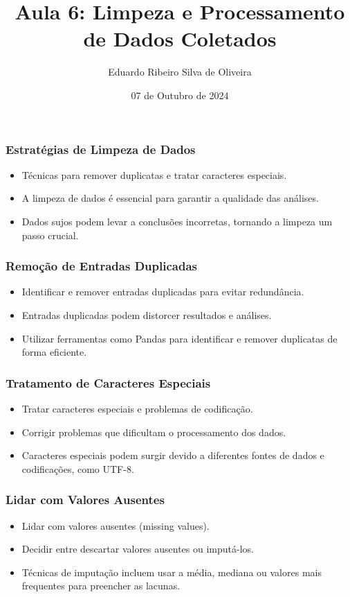\documentclass{beamer}
\title{Aula 6: Limpeza e Processamento de Dados Coletados}
\author{Eduardo Ribeiro Silva de Oliveira}
\date{07 de Outubro de 2024}
\begin{document}
\frame{\titlepage}

\begin{frame}
  \frametitle{Estratégias de Limpeza de Dados}
  \begin{itemize}
    \item Técnicas para remover duplicatas e tratar caracteres especiais.
    \item A limpeza de dados é essencial para garantir a qualidade das análises.
    \item Dados sujos podem levar a conclusões incorretas, tornando a limpeza um passo crucial.
  \end{itemize}
\end{frame}

\begin{frame}
  \frametitle{Remoção de Entradas Duplicadas}
  \begin{itemize}
    \item Identificar e remover entradas duplicadas para evitar redundância.
    \item Entradas duplicadas podem distorcer resultados e análises.
    \item Utilizar ferramentas como Pandas para identificar e remover duplicatas de forma eficiente.
  \end{itemize}
\end{frame}

\begin{frame}
  \frametitle{Tratamento de Caracteres Especiais}
  \begin{itemize}
    \item Tratar caracteres especiais e problemas de codificação.
    \item Corrigir problemas que dificultam o processamento dos dados.
    \item Caracteres especiais podem surgir devido a diferentes fontes de dados e codificações, como UTF-8.
  \end{itemize}
\end{frame}

\begin{frame}
  \frametitle{Lidar com Valores Ausentes}
  \begin{itemize}
    \item Lidar com valores ausentes (missing values).
    \item Decidir entre descartar valores ausentes ou imputá-los.
    \item Técnicas de imputação incluem usar a média, mediana ou valores mais frequentes para preencher as lacunas.
  \end{itemize}
\end{frame}
\end{document}
